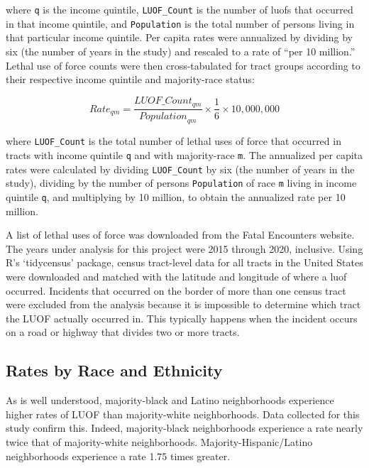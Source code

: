\documentclass[12pt]{article}
\begin{document}
\noindent{}where \texttt{q} is the income quintile, \texttt{LUOF\_Count} is the number of \acrshort{luof}s that occurred in that income quintile, and \texttt{Population} is the total number of persons living in that particular income quintile. Per capita rates were annualized by dividing by six (the number of years in the study) and rescaled to a rate of “per 10 million.” Lethal use of force counts were then cross-tabulated for tract groups according to their respective income quintile and majority-race status:

\begin{equation}
{Rate}_{qm}=\frac{{LUOF\_Count}_{qm}}{{Population}_{qm}}\times\frac{1}{6}\times10,000,000
\label{eq:quintile_majority_rate}
\end{equation}

\noindent{}where \texttt{LUOF\_Count} is the total number of lethal uses of force that occurred in tracts with income quintile \texttt{q} and with majority-race \texttt{m}. The annualized per capita rates were calculated by dividing \texttt{LUOF\_Count} by six (the number of years in the study), dividing by the number of persons \texttt{Population} of race \texttt{m} living in income quintile \texttt{q}, and multiplying by 10 million, to obtain the annualized rate per 10 million.

A list of lethal uses of force was downloaded from the Fatal Encounters website. The years under analysis for this project were 2015 through 2020, inclusive. Using R’s ‘tidycensus’ package, census tract-level data for all tracts in the United States were downloaded and matched with the latitude and longitude of where a \gls{luof} occurred. Incidents that occurred on the border of more than one census tract were excluded from the analysis because it is impossible to determine which tract the LUOF actually occurred in. This typically happens when the incident occurs on a road or highway that divides two or more tracts.

\subsection{Rates by Race and Ethnicity}

As is well understood, majority-black and Latino neighborhoods experience higher rates of LUOF than majority-white neighborhoods. Data collected for this study confirm this. Indeed, majority-black neighborhoods experience a rate nearly twice that of majority-white neighborhoods. Majority-Hispanic/Latino neighborhoods experience a rate 1.75 times greater.
\end{document}

